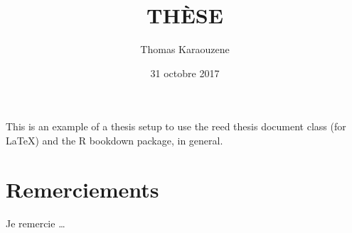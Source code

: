 \documentclass[12pt,twoside]{reedthesis}
\title{THÈSE}
\author{Thomas Karaouzene}
\date{31 octobre 2017}
\theoremstyle{definition}
\theoremstyle{definition}
\theoremstyle{remark}
\begin{document}
      \maketitle
  
  \frontmatter %
  \pagestyle{empty} %

  
      \begin{preface}
      This is an example of a thesis setup to use the reed thesis document
      class (for LaTeX) and the R bookdown package, in general.
    \end{preface}
  
      \hypersetup{linkcolor=black}
    \setcounter{tocdepth}{2}
    \tableofcontents
  
      \listoftables
  
      \listoffigures
  
  
  
  \mainmatter %
  \pagestyle{fancyplain} %

  \chapter*{Remerciements}\label{remerciements}
  
  Je remercie \ldots{}
  
  \newpage  
  
  ~
  
  ~
  
  ~
  
  ~
  
  ~
  
  ~
  
  ~
  
  ~
  
  ~
  
  ~
  
  ~
  
  ~
  
  ~
  
  ~
  
  ~
  
  ~
  
  ~
  
  ~
  
  ~
  
  ~
  
  ~
  
  ~
  
\end{document}
